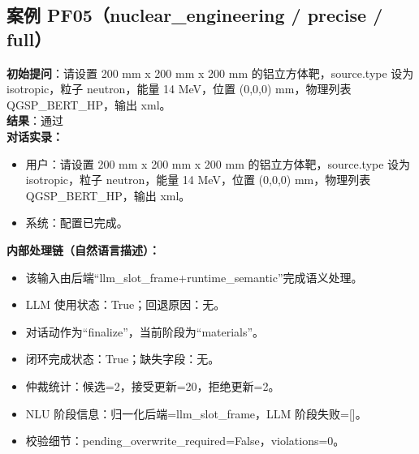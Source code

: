 \documentclass[11pt]{ctexart}
\begin{document}
\subsection{案例 PF05（nuclear\_engineering / precise / full）}
\textbf{初始提问}：请设置 200 mm x 200 mm x 200 mm 的铝立方体靶，source.type 设为 isotropic，粒子 neutron，能量 14 MeV，位置 (0,0,0) mm，物理列表 QGSP\_BERT\_HP，输出 xml。\\
\textbf{结果}：通过\\
\textbf{对话实录：}
\begin{itemize}
\item 用户：请设置 200 mm x 200 mm x 200 mm 的铝立方体靶，source.type 设为 isotropic，粒子 neutron，能量 14 MeV，位置 (0,0,0) mm，物理列表 QGSP\_BERT\_HP，输出 xml。
\item 系统：配置已完成。
\end{itemize}
\textbf{内部处理链（自然语言描述）：}
\begin{itemize}
\item 该输入由后端“llm\_slot\_frame+runtime\_semantic”完成语义处理。
\item LLM 使用状态：True；回退原因：无。
\item 对话动作为“finalize”，当前阶段为“materials”。
\item 闭环完成状态：True；缺失字段：无。
\item 仲裁统计：候选=2，接受更新=20，拒绝更新=2。
\item NLU 阶段信息：归一化后端=llm\_slot\_frame，LLM 阶段失败=[]。
\item 校验细节：pending\_overwrite\_required=False，violations=0。
\end{itemize}
\end{document}
